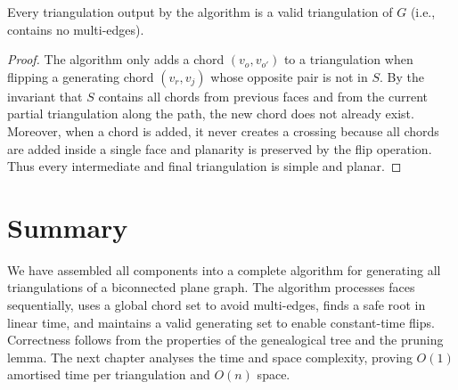 \begin{theorem}
    \label{thm:no_invalid}
    Every triangulation output by the algorithm is a valid triangulation of \(G\) (i.e., contains no multi-edges).
\end{theorem}

\begin{proof}
    The algorithm only adds a chord \((v_o, v_{o'})\) to a triangulation when flipping a generating chord \((v_r, v_j)\) whose opposite pair is not in \(S\). 
    By the invariant that \(S\) contains all chords from previous faces and from the current partial triangulation along the path, the new chord does not already exist. 
    Moreover, when a chord is added, it never creates a crossing because all chords are added inside a single face and planarity is preserved by the flip operation. 
    Thus every intermediate and final triangulation is simple and planar.
\end{proof}

\section{Summary}
\label{sec:complete_summary}

We have assembled all components into a complete algorithm for generating all triangulations of a biconnected plane graph. 
The algorithm processes faces sequentially, uses a global chord set to avoid multi-edges, finds a safe root in linear time, and maintains a valid generating set to enable constant-time flips. 
Correctness follows from the properties of the genealogical tree and the pruning lemma. 
The next chapter analyses the time and space complexity, proving \(O(1)\) amortised time per triangulation and \(O(n)\) space.